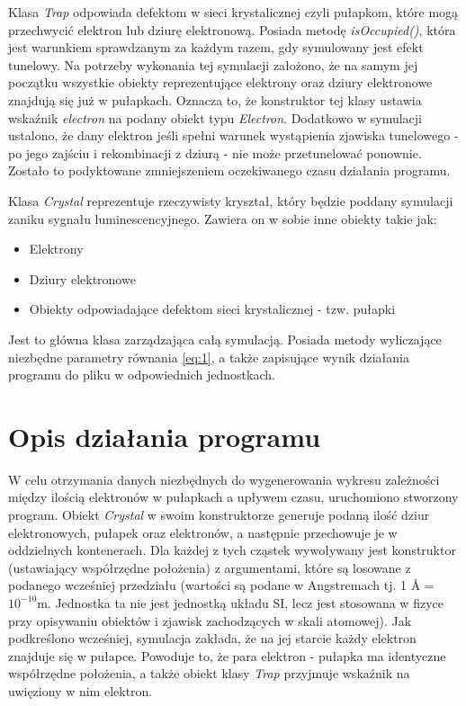 Klasa \textit{Trap} odpowiada defektom w sieci krystalicznej czyli pułapkom, które mogą przechwycić elektron lub dziurę elektronową. Posiada metodę \textit{isOccupied()}, która jest warunkiem sprawdzanym za każdym razem, gdy symulowany jest efekt tunelowy. Na potrzeby wykonania tej symulacji założono, że na samym jej początku wszystkie obiekty reprezentujące elektrony oraz dziury elektronowe znajdują się już w pułapkach. Oznacza to, że konstruktor tej klasy ustawia wskaźnik \textit{electron} na podany obiekt typu \textit{Electron}. Dodatkowo w symulacji ustalono, że dany elektron jeśli spełni warunek wystąpienia zjawiska tunelowego - po jego zajściu i rekombinacji z dziurą - nie może przetunelować ponownie. Zostało to podyktowane zmniejszeniem oczekiwanego czasu działania programu.

Klasa \textit{Crystal} reprezentuje rzeczywisty kryształ, który będzie poddany symulacji zaniku sygnału luminescencyjnego. Zawiera on w sobie inne obiekty takie jak:

\begin{itemize}
\item Elektrony
\item Dziury elektronowe
\item Obiekty odpowiadające defektom sieci krystalicznej - tzw. pułapki
\end{itemize}

Jest to główna klasa zarządzająca całą symulacją. Posiada metody wyliczające niezbędne parametry równania \ref{eq:1}, a także zapisujące wynik działania programu do pliku w odpowiednich jednostkach.





\section{Opis działania programu}



W celu otrzymania danych niezbędnych do wygenerowania wykresu zależności między ilością elektronów w pułapkach a upływem czasu, uruchomiono stworzony program. Obiekt \textit{Crystal} w swoim konstruktorze generuje podaną ilość dziur elektronowych, pułapek oraz elektronów, a następnie przechowuje je w oddzielnych kontenerach. Dla każdej z tych cząstek wywoływany jest konstruktor (ustawiający współrzędne położenia) z argumentami, które są losowane z podanego wcześniej przedziału (wartości są podane w Angstremach tj. 1 Å = $10^{-10}$m. Jednostka ta nie jest jednostką układu SI, lecz jest stosowana w fizyce przy opisywaniu obiektów i zjawisk zachodzących w skali atomowej). Jak podkreślono wcześniej, symulacja zakłada, że na jej starcie każdy elektron znajduje się w pułapce. Powoduje to, że para elektron - pułapka ma identyczne współrzędne położenia, a także obiekt klasy \textit{Trap} przyjmuje wskaźnik na uwięziony w nim elektron.

